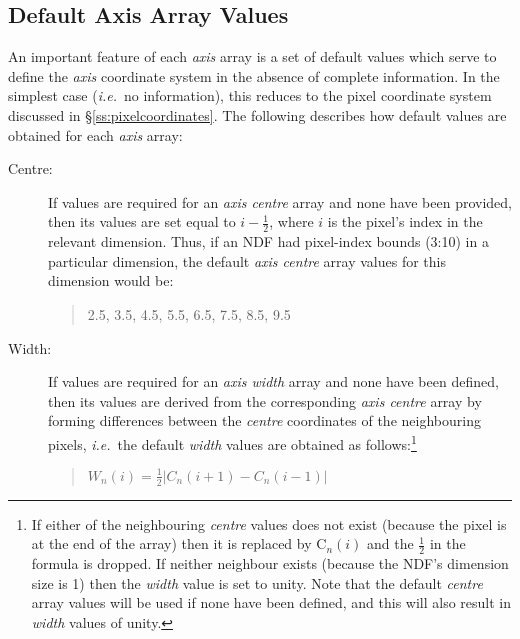 \documentclass[twoside,11pt]{article}
\newcommand{\xlabel}[1]{}
\newcommand{\st}[1]{{\em{#1}}}
\begin{document}
\subsection{\xlabel{default_axis_array_values}\label{ss:axisdefaults}Default Axis Array Values}

An important feature of each \st{axis\/} array is a set of default values
which serve to define the \st{axis\/} coordinate system in the absence of
complete information. 
In the simplest case (\st{i.e.}\ no information), this reduces to the pixel
coordinate system discussed in \S\ref{ss:pixelcoordinates}. 
The following describes how default values are obtained for each \st{axis\/} array: 

\begin{description}

\item[Centre:]
If values are required for an \st{axis centre\/} array and none have been
provided, then its values are set equal to $i-\frac{1}{2}$, where $i$ is the
pixel's index in the relevant dimension. 
Thus, if an NDF had pixel-index bounds (3:10) in a particular dimension, the
default \st{axis centre\/} array values for this dimension would be:

\small
\begin{quote}
\begin{center}
2.5, 3.5, 4.5, 5.5, 6.5, 7.5, 8.5, 9.5
\end{center}
\end{quote}
\normalsize

\item[Width:]
If values are required for an \st{axis width\/} array and none have been
defined, then its values are derived from the corresponding \st{axis
centre\/} array by forming differences between the \st{centre\/}
coordinates of the neighbouring pixels, \st{i.e.}\ the default \st{
width\/} values are obtained as follows:\footnote{If either of the
neighbouring \st{centre\/} values does not exist (because the pixel is at
the end of the array) then it is replaced by C$_{n}(i)$ and the
$\frac{1}{2}$ in the formula is dropped. If neither neighbour exists
(because the NDF's dimension size is 1) then the \st{width\/} value is set
to unity. 
Note that the default \st{centre\/} array values will be used if none have
been defined, and this will also result in \st{width\/} values of unity.} 

\small
\begin{quote}
\begin{center}
$W_{n}(i) = \frac{1}{2} |C_n(i+1) - C_{n}(i-1)|$
\end{center}
\end{quote}
\normalsize


\end{description}
\end{document}

